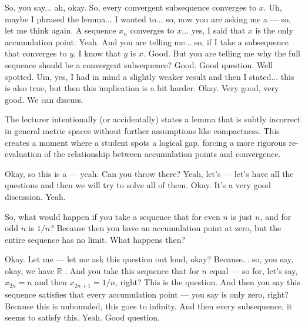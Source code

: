 \begin{spoken-clean}[00:08:16 - 00:09:30]
So, you say... ah, okay. So, every convergent subsequence converges to $x$. Uh, maybe I phrased the lemma... I wanted to... so, now you are asking me a — so, let me think again. A sequence $x_n$ converges to $x$... yes, I said that $x$ is the only accumulation point. Yeah. And you are telling me... so, if I take a subsequence that converges to $y$, I know that $y$ is $x$. Good. But you are telling me why the full sequence should be a convergent subsequence? Good. Good question. Well spotted. Um, yes, I had in mind a slightly weaker result and then I stated... this is also true, but then this implication is a bit harder. Okay. Very good, very good. We can discuss.
\end{spoken-clean}

\begin{didactic-insight}
The lecturer intentionally (or accidentally) states a lemma that is subtly incorrect in general metric spaces without further assumptions like compactness. This creates a  moment where a student spots a logical gap, forcing a more rigorous re-evaluation of the relationship between accumulation points and convergence.
\end{didactic-insight}

\begin{spoken-clean}[00:09:31 - 00:11:23]
Okay, so this is a — yeah. Can you throw there? Yeah, let's — let's have all the questions and then we will try to solve all of them. Okay. It's a very good discussion. Yeah. 
\end{spoken-clean}

\begin{student-interaction}
So, what would happen if you take a sequence that for even $n$ is just $n$, and for odd $n$ is $1/n$? Because then you have an accumulation point at zero, but the entire sequence has no limit. What happens then?
\end{student-interaction}

\begin{spoken-clean}[continued]
 Okay. Let me — let me ask this question out loud, okay? Because... so, you say, okay, we have $\mathbb{R}$ . And you take this sequence that for $n$ equal — so for, let's say, $x_{2n} = n$ and then $x_{2n+1} = 1/n$, right? This is the question. And then you say this sequence satisfies that every accumulation point — you say is only zero, right? Because this is unbounded, this goes to infinity. And then every subsequence, it seems to satisfy this. Yeah. Good question.
\end{spoken-clean}


